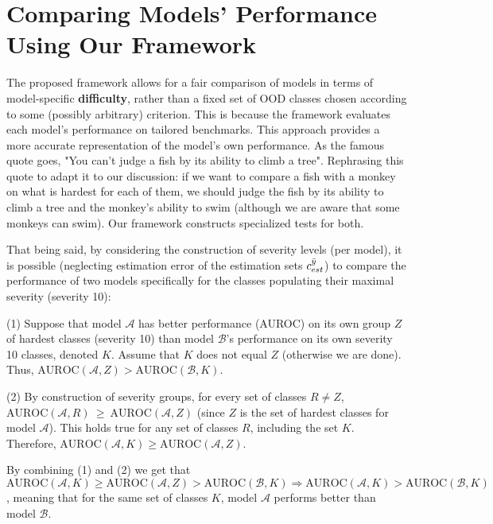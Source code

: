 \documentclass[table]{article} \usepackage{PRIMEarxiv}
\begin{document}
\section{Comparing Models' Performance Using Our Framework}
\label{sec:criticism-comparison}
The proposed framework allows for a fair comparison of models in terms of model-specific \textbf{difficulty}, rather than a fixed set of OOD classes chosen according to some (possibly arbitrary) criterion.
This is because the framework evaluates each model's performance on tailored benchmarks. This approach provides a more accurate representation of the model's own performance.
As the famous quote goes, "You can't judge a fish by its ability to climb a tree". Rephrasing this quote to adapt it to our discussion: if we want to compare a fish with a monkey on what is hardest for each of them, we should judge the fish by its ability to climb a tree and the monkey's ability to swim (although we are aware that some monkeys can swim). Our framework constructs specialized tests for both.






That being said, by considering the construction of severity levels (per model), it is possible (neglecting estimation error of the estimation sets $c_{est}^{\Bar{y}}$) to compare the performance of two models specifically for the classes populating their maximal severity (severity 10):

(1) Suppose that model $\mathcal{A}$ has better performance (AUROC) on its own group $Z$ of hardest classes (severity 10) than model $\mathcal{B}$'s performance on its own severity 10 classes, denoted $K$. Assume that $K$ does not equal $Z$ (otherwise we are done). Thus, $\text{AUROC}(\mathcal{A},Z) > \text{AUROC}(\mathcal{B},K)$.

(2) By construction of severity groups, for every set of classes $R \neq Z$, $\text{AUROC}(\mathcal{A},R)~\geq~\text{AUROC}(\mathcal{A},Z)$ (since $Z$ is the set of hardest classes for model $\mathcal{A}$). This holds true for any set of classes $R$, including the set $K$. Therefore, $\text{AUROC}(\mathcal{A},K) \geq \text{AUROC}(\mathcal{A},Z)$.

By combining (1) and (2) we get that $\text{AUROC}(\mathcal{A},K)\geq\text{AUROC}(\mathcal{A},Z)>\text{AUROC}(\mathcal{B},K) \Rightarrow \text{AUROC}(\mathcal{A},K)>\text{AUROC}(\mathcal{B},K)$, meaning that for the same set of classes $K$, model $\mathcal{A}$ performs better than model $\mathcal{B}$.
\end{document}
